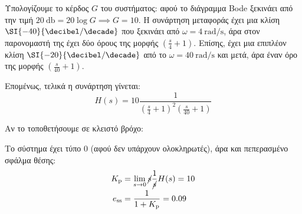 \documentclass[11pt,a4paper,notitlepage,fleqn,final]{article}
\begin{document}
\begin{exercise}
Υπολογίζουμε το κέρδος \( G \) του συστήματος: αφού το διάγραμμα Bode ξεκινάει από την τιμή
\( \SI{20}{\decibel} = 20\log G \implies G = 10 \). Η συνάρτηση μεταφοράς έχει μια κλίση
\( \SI{-40}{\decibel/\decade} \) που ξεκινάει από \( \omega = \SI{4}{\radian/\second} \),
άρα στον παρονομαστή της έχει δύο όρους της μορφής \( \left(\frac{s}{4}+1\right) \). Επίσης,
έχει μια επιπλέον κλίση \( \SI{-20}{\decibel/\decade} \) από το \( \omega = \SI{40}{\radian/\second} \) και μετά, άρα έναν όρο της μορφής \( \left(\frac{s}{40} + 1\right) \).

Επομένως, τελικά η συνάρτηση γίνεται:
\[
H(s) = 10 \frac{1}{\left(\frac{s}{4}+1\right)^2\left(\frac{s}{40}+1\right)}
\]

Αν το τοποθετήσουμε σε κλειστό βρόχο:


Το σύστημα έχει τύπο 0 (αφού δεν υπάρχουν ολοκληρωτές), άρα και πεπερασμένο σφάλμα θέσης:
\begin{align*}
	K_{\mathrm{p}} &= \lim_{s\to 0} \cancel{s}\frac{1}{\cancel{s}}H(s) = 10 \\
	e_{\mathrm{ss}} &= \frac{1}{1+K_{\mathrm{p}}} = 0.09
\end{align*}

\end{exercise}
\end{document}
